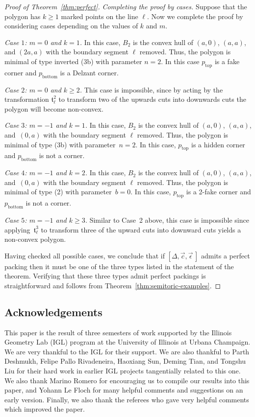 \documentclass[pdftex]{sigma}
\numberwithin{equation}{section}
\newcommand{\De}{\Delta}
\newcommand{\stpoly}{[\De,\vec{c},\vec{\epsilon}\,]}
\begin{document}
\begin{proof}[Proof of Theorem~\ref{thm:perfect}]
{\it Completing the proof by cases.}
Suppose that the polygon has $k\geq 1$ marked points on the line $\ell$.
Now we complete the proof by considering cases depending on the values of $k$ and $m$.

{\it Case $1$: $m=0$ and $k=1$.}
In this case, $B_2$ is the convex hull of $(a,0)$, $(a,a)$, and $(2a,a)$ with the boundary segment $\ell$ removed. Thus, the polygon is minimal of type inverted (3b) with parameter $n=2$. In this case $p_{\text{top}}$ is a fake corner and $p_{\text{bottom}}$ is a Delzant corner.

{\it Case $2$: $m=0$ and $k\geq 2$.}
This case is impossible, since by acting by the transformation $\mathfrak{t}_\ell^{2}$ to transform two of the upwards cuts into downwards cuts the polygon will become non-convex.

{\it Case $3$: $m=-1$ and $k=1$.}
In this case, $B_2$ is the convex hull of $(a,0)$, $(a,a)$, and~$(0,a)$ with the boundary segment $\ell$ removed. Thus, the polygon is minimal of type (3b) with parameter~${n=2}$.
In this case, $p_{\text{top}}$ is a hidden corner and $p_{\text{bottom}}$ is not a corner.

{\it Case $4$: $m=-1$ and $k=2$.}
In this case, $B_2$ is the convex hull of $(a,0)$, $(a,a)$, and~$(0,a)$ with the boundary segment $\ell$ removed. Thus, the polygon is minimal of type (2) with parameter~$b=0$.
In this case, $p_{\text{top}}$ is a 2-fake corner and $p_{\text{bottom}}$ is not a corner.

{\it Case $5$: $m=-1$ and $k\geq 3$.}
Similar to Case~2 above, this case is impossible since applying~$\mathfrak{t}_\ell^{3}$ to transform three of the upward cuts into downward cuts yields a non-convex polygon.

Having checked all possible cases, we conclude that if $\stpoly$ admits a perfect packing then it must be one of the three types listed in the statement of the theorem. Verifying that these three types admit perfect packings is straightforward and follows from Theorem~\ref{thm:semitoric-examples}.
\end{proof}

\subsection*{Acknowledgements}

This paper is the result of three semesters of work supported by the Illinois Geometry Lab (IGL) program at the University of Illinois at Urbana Champaign.
We are very thankful to the IGL for their support.
We are also thankful to Parth Deshmukh, Felipe Pallo Rivadeneira, Haoxiang Sun, Deming Tian, and Tongshu Liu
for their hard work in
earlier IGL projects tangentially related to this one.
We also thank Marino Romero for encouraging us to compile our results into this paper, and Yohann Le Floch for many helpful comments and suggestions on an early version.
Finally, we also thank the referees who gave very helpful comments which improved the paper.
\end{document}
